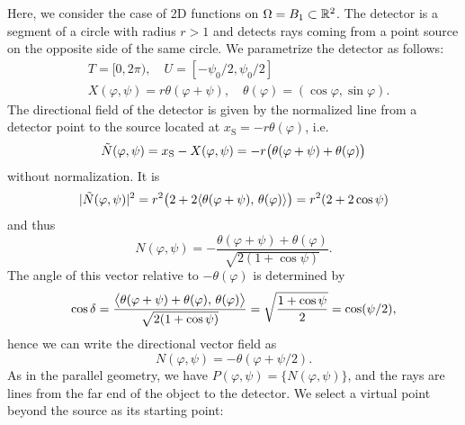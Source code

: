 \documentclass{amsart}
\renewcommand*{\phi}{\varphi}
\begin{document}
\begin{example}
 Here, we consider the case of 2D functions on $\Omega = B_1 \subset {\ensuremath{\mathbb{R}}}^2$. The detector is a segment of a circle with radius $r > 1$ and 
 detects rays coming from a point source on the opposite side of the same circle. We parametrize the detector as follows:
 \begin{align*}
  & T = [0, 2\pi),\quad U = [-\psi_0/2, \psi_0/2] \\
  & X(\phi, \psi) = r \theta(\phi + \psi), \quad \theta(\phi) = (\cos\phi, \sin\phi).
 \end{align*}
 The directional field of the detector is given by the normalized line from a detector point to the source located at 
 $x_{\mathrm{S}} = -r \theta(\phi)$, i.e.
 \begin{equation*}
  \tilde N(\phi, \psi) 
  = x_{\mathrm{S}} - X(\phi, \psi) \\
  = - r \big(\theta(\phi + \psi) + \theta(\phi)\big)
 \end{equation*}
 without normalization. It is
 \begin{align*}
  \ABS{\tilde N(\phi, \psi)}^2 = r^2 \big(2 + 2\INNER{\theta(\phi + \psi)}{\theta(\phi)} \big) = r^2 (2 + 2\cos\psi)
 \end{align*}
 and thus
 \begin{equation*}
  N(\phi,\psi) = - \frac{\theta(\phi + \psi) + \theta(\phi)}{\sqrt{2(1 + \cos\psi)}}.
 \end{equation*}
 The angle of this vector relative to $-\theta(\phi)$ is determined by
 \begin{align*}
  \cos\delta = \frac{\INNERbig{\theta(\phi + \psi) + \theta(\phi)}{\theta(\phi)}}{\sqrt{2(1 + \cos\psi)}} 
  = \sqrt{\frac{1 + \cos\psi}{2}} = \cos(\psi/2),
 \end{align*}
 hence we can write the directional vector field as
 \begin{equation}
  \label{eq:fanbeam_dir_field}
  N(\phi,\psi) = - \theta(\phi + \psi/2).
 \end{equation} 
 As in the parallel geometry, we have $P(\phi,\psi) = \lbrace N(\phi,\psi)\rbrace$, and the rays are lines from the far end of 
 the object to the detector. We select a virtual point beyond the source as its starting point:

\end{example}
\end{document}
